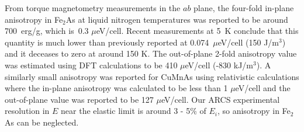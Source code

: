 \documentclass[10pt,doublespacing,edeposit]{uiucthesis2020}
\begin{document}
\begin{mainmatter}
From torque magnetometry measurements in the $ab$ plane, the four-fold in-plane anisotropy in Fe$_2$As at liquid nitrogen temperatures was reported to be around 700~erg/g, which is~0.3 $\mu$eV/cell.\cite{Achiwa1967}
Recent measurements at 5~K conclude that this quantity is much lower than previously reported at 0.074~$\mu$eV/cell (150 J/m$^3$) and it deceases to zero at around 150 K.\cite{Yang2020}
The out-of-plane 2-fold anisotropy value was estimated using DFT calculations to be 410 $\mu$eV/cell (-830 kJ/m$^3$).\cite{Yang2020} A similarly small anisotropy was reported for CuMnAs using relativistic calculations where the in-plane anisotropy was calculated to be less than 1 $\mu$eV/cell and the out-of-plane value was reported to be 127 $\mu$eV/cell.\cite{Wadley2015} Our ARCS experimental resolution in $E$ near the elastic limit is around  3 - 5\% of $E_i$, so anisotropy in Fe$_2$As can be neglected. 



\end{mainmatter}
\end{document}
